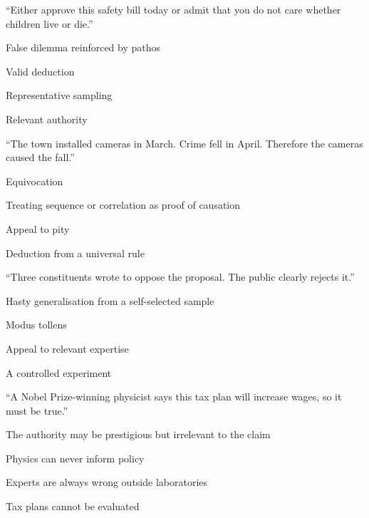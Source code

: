 \documentclass[a4paper,nofonts,sfsidenotes]{tufte-handout}
\begin{document}
\begin{exercisequestions}
  \item \enquote{Either approve this safety bill today or admit that you do not
    care whether children live or die.}
    \begin{choices}
      \item False dilemma reinforced by pathos
      \item Valid deduction
      \item Representative sampling
      \item Relevant authority
    \end{choices}

  \item \enquote{The town installed cameras in March. Crime fell in April.
    Therefore the cameras caused the fall.}
    \begin{choices}
      \item Equivocation
      \item Treating sequence or correlation as proof of causation
      \item Appeal to pity
      \item Deduction from a universal rule
    \end{choices}

  \item \enquote{Three constituents wrote to oppose the proposal. The public
    clearly rejects it.}
    \begin{choices}
      \item Hasty generalisation from a self-selected sample
      \item Modus tollens
      \item Appeal to relevant expertise
      \item A controlled experiment
    \end{choices}

  \item \enquote{A Nobel Prize-winning physicist says this tax plan will
    increase wages, so it must be true.}
    \begin{choices}
      \item The authority may be prestigious but irrelevant to the claim
      \item Physics can never inform policy
      \item Experts are always wrong outside laboratories
      \item Tax plans cannot be evaluated
    \end{choices}


\end{exercisequestions}
\end{document}
